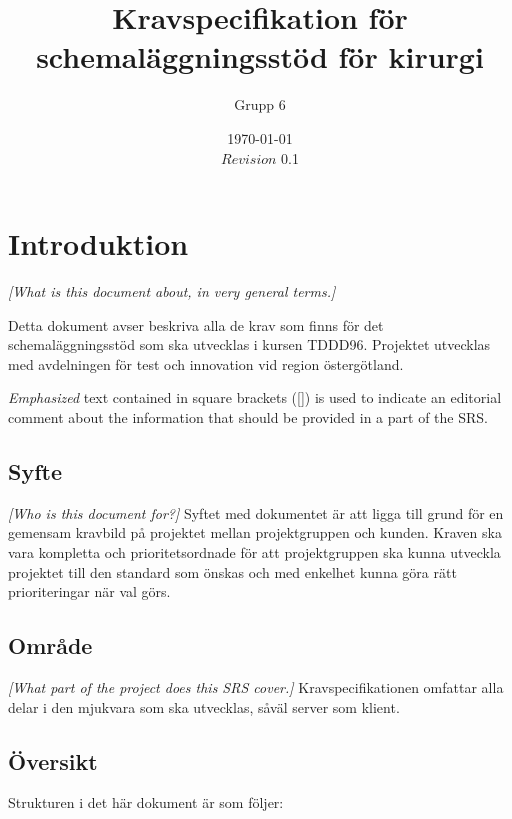 \documentclass{article}
\begin{document}
\title{Kravspecifikation för schemaläggningsstöd för kirurgi}
\author{Grupp 6}
\date{\today \\ $Revision$ 0.1 }




\section{Introduktion}
\emph{[What is this document about, in very general terms.]}

Detta dokument avser beskriva alla de krav som finns för det schemaläggningsstöd
som ska utvecklas i kursen TDDD96. Projektet utvecklas med avdelningen för test
och innovation vid region östergötland.

\emph{Emphasized} text contained in square brackets ([]) is used to indicate
an editorial comment about the information that should be provided in a part
of the \ac{SRS}.

\subsection{Syfte}
\emph{[Who is this document for?]}
Syftet med dokumentet är att ligga till grund för en gemensam kravbild på
projektet mellan projektgruppen och kunden. Kraven ska vara kompletta och
prioritetsordnade för att projektgruppen ska kunna utveckla projektet till den
standard som önskas och med enkelhet kunna göra rätt prioriteringar när val görs.

\subsection{Område}
\emph{[What part of the project does this SRS cover.]}
Kravspecifikationen omfattar alla delar i den mjukvara som ska utvecklas, såväl
server som klient.

\subsection{Översikt}
Strukturen i det här dokument är som följer:
\end{document}
